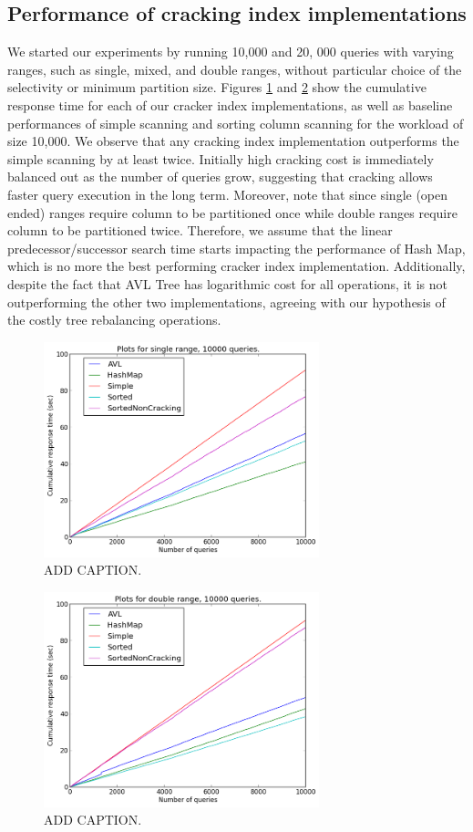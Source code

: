 \subsection{Performance of cracking index implementations}
We started our experiments by running 10,000 and 20, 000 queries with varying ranges, such as single, mixed, and double ranges, without particular choice of the selectivity or minimum partition size. Figures \ref{fig:single10000} and \ref{fig:double10000} show the cumulative response time for each of our cracker index implementations, as well as baseline performances of simple scanning and sorting column scanning for the workload of size 10,000. We observe that any cracking index implementation outperforms the simple scanning by at least twice. Initially high cracking cost is immediately balanced out as the number of queries grow, suggesting that cracking allows faster query execution in the long term. Moreover, note that since single (open ended) ranges require column to be partitioned once while double ranges require column to be partitioned twice. Therefore, we assume that the linear predecessor/successor search time starts impacting the performance of Hash Map, which is no more the best performing cracker index implementation. Additionally, despite the fact that AVL Tree has logarithmic cost for all operations, it is not outperforming the other two implementations, agreeing with our hypothesis of the costly tree rebalancing operations.

\begin{figure}[h]
\includegraphics[width=8cm]{figures/single10000}
\caption{ADD CAPTION.}
\label{fig:single10000}
\end{figure}

\begin{figure}[h]
\includegraphics[width=8cm]{figures/double10000}
\caption{ADD CAPTION.}
\label{fig:double10000}
\end{figure}

